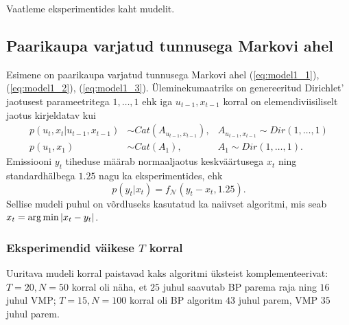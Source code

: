 Vaatleme eksperimentides kaht mudelit. 

\subsection{Paarikaupa varjatud tunnusega Markovi ahel}\label{sec:experiments_PMM}

Esimene on paarikaupa varjatud tunnusega Markovi ahel (\ref{eq:model1_1}), (\ref{eq:model1_2}), (\ref{eq:model1_3}). Üleminekumaatriks on genereeritud Dirichlet' jaotusest parameetritega $1,\ldots,1$ ehk iga $u_{t-1},x_{t-1}$ korral on elemendiviisiliselt jaotus kirjeldatav kui
\begin{align}
    \label{eq:hmm1}
    p(u_t,x_t | u_{t-1},x_{t-1}) &\sim Cat(A_{u_{t-1},x_{t-1}}),& A_{u_{t-1},x_{t-1}} \sim Dir(1,\ldots,1)\\
    \label{eq:hmm2}
    p(u_1,x_1) &\sim Cat(A_1), &A_1 \sim Dir(1,\ldots,1) .
\end{align}
Emissiooni $y_t$ tiheduse määrab normaaljaotus keskväärtusega $x_t$ ning standardhälbega $1.25$ nagu ka \parencite{Soop.2023} eksperimentides, ehk 
\begin{equation}
    \label{eq:hmm3}
    p(y_t|x_t) = f_{\mathcal{N}}(y_t-x_t,1.25).
\end{equation}
Sellise mudeli puhul on võrdluseks kasutatud ka naiivset algoritmi, mis seab $x_t = \operatorname*{arg\,min} |x_t - y_t|$.

\subsubsection{Eksperimendid väikese $T$ korral}

Uuritava mudeli korral paistavad kaks algoritmi üksteist komplementeerivat: $T=20,N=50$ korral oli näha, et $25$ juhul saavutab BP parema raja ning $16$ juhul VMP; $T=15,N=100$ korral oli BP algoritm $43$ juhul parem, VMP $35$ juhul parem.

